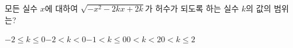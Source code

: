 모든 실수 $x$에 대하여 $\sqrt{-x^2-2kx+2k}$가 허수가 되도록 하는 실수 $k$의 값의 범위는?
\begin{choicesii}{$-2\le k\le 0$}{$-2<k<0$}{$-1<k\le 0$}{$0<k<2$}{$0<k\le 2$}\end{choicesii}
